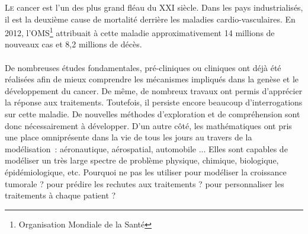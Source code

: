 \documentclass[main.tex]{subfiles}
\begin{document}

\lettrine{L}{e} cancer est l'un des plus grand fléau du XXI\ieme %
siècle.  Dans les pays industrialisés, il est la deuxième cause de mortalité derrière les maladies cardio-vasculaires. 
En 2012, l'OMS\footnote{Organisation Mondiale de la Santé} attribuait à cette maladie approximativement 14 millions de nouveaux cas et 8,2 millions de décès. 

\paragraph{}
De nombreuses études fondamentales, pré-cliniques ou cliniques ont déjà été réalisées afin de mieux comprendre les mécanismes impliqués dans la genèse et le développement du cancer. De même, de nombreux travaux ont permis d'apprécier la réponse aux traitements. Toutefois, il persiste encore beaucoup d'interrogations sur cette maladie. De nouvelles méthodes d'exploration et de compréhension sont donc nécessairement à développer.
 D'un autre côté, les mathématiques ont pris une place omniprésente dans la vie de tous les jours au travers de la modélisation~: aéronautique, aérospatial, automobile ... Elles sont capables de modéliser un très large spectre de problème physique, chimique, biologique, épidémiologique, etc. Pourquoi ne pas les utiliser pour modéliser la croissance tumorale ? pour prédire les rechutes aux traitements ? pour personnaliser les traitements à chaque patient ? 
 
\end{document}
